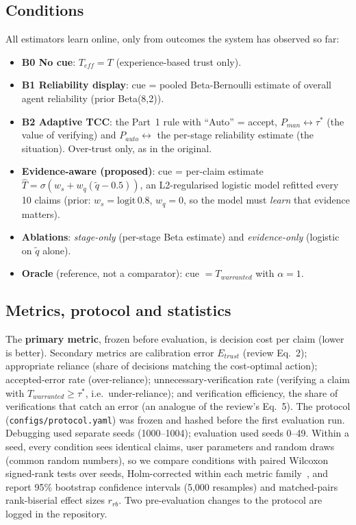 \documentclass[10pt]{article}
\begin{document}
\subsection{Conditions}
All estimators learn online, only from outcomes the system has observed so far:
\begin{itemize}\setlength\itemsep{1pt}
\item \textbf{B0 No cue}: $T_{eff}=T$ (experience-based trust only).
\item \textbf{B1 Reliability display}: cue = pooled Beta-Bernoulli estimate of overall agent reliability (prior Beta(8,2)).
\item \textbf{B2 Adaptive TCC}: the Part~1 rule with ``Auto'' = accept, $P_{man}\leftrightarrow\tau^*$ (the value of verifying) and $P_{auto}\leftrightarrow$ the per-stage reliability estimate (the situation). Over-trust only, as in the original.
\item \textbf{Evidence-aware (proposed)}: cue = per-claim estimate $\hat T=\sigma(w_s+w_q(\tilde q-0.5))$, an L2-regularised logistic model refitted every 10 claims (prior: $w_s=\mathrm{logit}\,0.8$, $w_q=0$, so the model must \emph{learn} that evidence matters).
\item \textbf{Ablations}: \emph{stage-only} (per-stage Beta estimate) and \emph{evidence-only} (logistic on $\tilde q$ alone).
\item \textbf{Oracle} (reference, not a comparator): cue $=T_{warranted}$ with $\alpha=1$.
\end{itemize}

\subsection{Metrics, protocol and statistics}
The \textbf{primary metric}, frozen before evaluation, is decision cost per claim (lower is better). Secondary metrics are calibration error $E_{trust}$ (review Eq.~2); appropriate reliance (share of decisions matching the cost-optimal action); accepted-error rate (over-reliance); unnecessary-verification rate (verifying a claim with $T_{warranted}\ge\tau^*$, i.e.\ under-reliance); and verification efficiency, the share of verifications that catch an error (an analogue of the review's Eq.~5).
The protocol (\texttt{configs/protocol.yaml}) was frozen and hashed before the first evaluation run. Debugging used separate seeds (1000--1004); evaluation used seeds 0--49. Within a seed, every condition sees identical claims, user parameters and random draws (common random numbers), so we compare conditions with paired Wilcoxon signed-rank tests over seeds, Holm-corrected within each metric family~\cite{holm1979simple}, and report 95\% bootstrap confidence intervals (5{,}000 resamples) and matched-pairs rank-biserial effect sizes $r_{rb}$. Two pre-evaluation changes to the protocol are logged in the repository.
\end{document}
